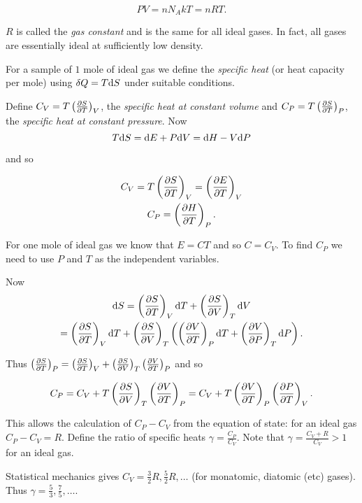 \documentclass{notes}
\newcommand{\pdf}[3]{\left(\pd{#1}{#2}\right)_{#3}}
\begin{document}
\begin{equation}\label{eq:idgasmole}
PV = n N_A k T = n R T.
\end{equation}

$R$ is called the \emph{gas constant} and is the same for all ideal gases.
In fact, all gases are essentially ideal at sufficiently low density.

For a sample of $1$ mole of ideal gas we define the \emph{specific heat}
(or heat capacity per mole) using $\delta Q = T \mathrm{d} S$ under suitable
conditions.

Define $C_V = T \pdf{S}{T}{V}$, the \emph{specific heat at
constant volume} and $C_P = T \pdf{S}{T}{P}$, the \emph{specific heat at
constant pressure}. Now
\[
T \mathrm{d} S = \mathrm{d} E + P \mathrm{d} V = \mathrm{d} H - V \mathrm{d} P
\]

and so

\begin{equation}\label{eq:spheats}
\begin{gathered}
C_V = T \pdf{S}{T}{V} = \pdf{E}{T}{V} \\
C_P = \pdf{H}{T}{P}.
\end{gathered}
\end{equation}

For one mole of ideal gas we know that $E = C T$ and so $C = C_V$.
To find $C_P$ we need to use $P$ and $T$ as the independent variables.

Now
\begin{multline*}
\ud S = \pdf{S}{T}{V} \ud T + \pdf{S}{V}{T} \ud V \\
= \pdf{S}{T}{V} \ud T + \pdf{S}{V}{T} \left( \pdf{V}{T}{P} \ud T
+ \pdf{V}{P}{T} \ud P \right).
\end{multline*}

Thus $\pdf{S}{T}{P} = \pdf{S}{T}{V} + \pdf{S}{V}{T} \pdf{V}{T}{P}$
and so

\begin{equation}\label{eq:cpcv}
C_P = C_V + T \pdf{S}{V}{T} \pdf{V}{T}{P} 
= C_V + T \pdf{V}{T}{P} \pdf{P}{T}{V}.
\end{equation}

This allows the calculation of $C_P - C_V$ from the equation of
state: for an ideal gas $C_P - C_V = R$.  Define the
ratio of specific heats $\gamma = \tfrac{C_P}{C_V}$.  Note
that $\gamma = \tfrac{C_V + R}{C_V} > 1$ for an ideal gas.

Statistical mechanics gives $C_V = \tfrac{3}{2} R, \tfrac{5}{2} R,\dots$
(for monatomic, diatomic (etc) gases).  Thus $\gamma = \tfrac{5}{3},
\tfrac{7}{5},\dots$.
\end{document}
